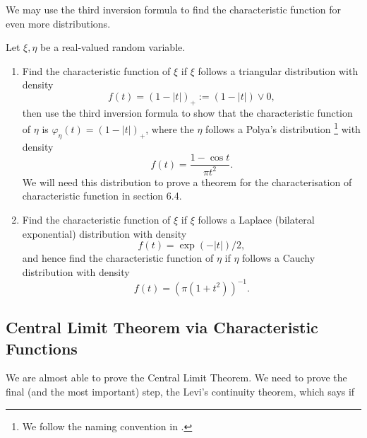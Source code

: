 We may use the third inversion formula to find the characteristic function for even more distributions.
\begin{exercise}
Let $\xi,\eta$ be a real-valued random variable.
\begin{enumerate}
    \item Find the characteristic function of $\xi$ if $\xi$ follows a triangular distribution with density
    \begin{equation}
        f(t) = (1-|t|)_+ := (1-|t|) \vee 0,
    \end{equation}
    then use the third inversion formula to show that the characteristic function of $\eta$ is $\varphi_\eta(t) = (1-|t|)_+$, where the $\eta$ follows a Polya's distribution \footnote{We follow the naming convention in \cite{Durrett}.} with density
    \begin{equation}
        f(t) = \frac{1-\cos t}{\pi t^2}.
    \end{equation}
    We will need this distribution to prove a theorem for the characterisation of characteristic function in section 6.4.
    \item Find the characteristic function of $\xi$ if $\xi$ follows a Laplace (bilateral exponential) distribution with density
    \begin{equation}
        f(t) = \exp(-|t|)/2,
    \end{equation}
    and hence find the characteristic function of $\eta$ if $\eta$ follows a Cauchy distribution with density
    \begin{equation}
        f(t) = (\pi(1+t^2))^{-1}.
    \end{equation}
\end{enumerate}
\end{exercise}

\subsection{Central Limit Theorem via Characteristic Functions}
We are almost able to prove the Central Limit Theorem. We need to prove the final (and the most important) step, the Levi's continuity theorem, which says if 

